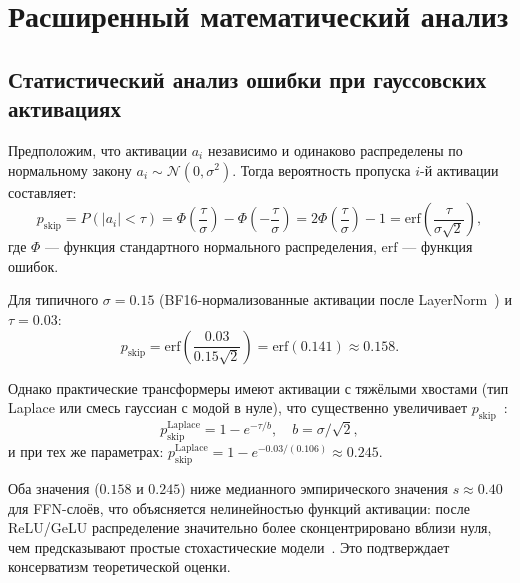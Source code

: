 
\section{Расширенный математический анализ}
\label{sec:glava87-extended-math}

\subsection{Статистический анализ ошибки при гауссовских активациях}
\label{ssec:glava87-gaussian}

Предположим, что активации $a_i$ независимо и одинаково распределены
по нормальному закону $a_i \sim \mathcal{N}(0, \sigma^2)$.  Тогда
вероятность пропуска $i$-й активации составляет:
\begin{equation}
  p_{\text{skip}} = P(|a_i| < \tau)
  = \Phi\left(\frac{\tau}{\sigma}\right)
  - \Phi\left(-\frac{\tau}{\sigma}\right)
  = 2\Phi\left(\frac{\tau}{\sigma}\right) - 1
  = \mathrm{erf}\left(\frac{\tau}{\sigma\sqrt{2}}\right),
  \label{eq:p-skip-gaussian}
\end{equation}
где $\Phi$ — функция стандартного нормального распределения,
$\mathrm{erf}$ — функция ошибок.

Для типичного $\sigma = 0{.}15$ (BF16-нормализованные активации
после LayerNorm~\cite{koren2024sparsity}) и $\tau = 0{.}03$:
\begin{equation}
  p_{\text{skip}} = \mathrm{erf}\left(\frac{0{.}03}{0{.}15\sqrt{2}}\right)
  = \mathrm{erf}(0{.}141) \approx 0{.}158.
  \label{eq:p-skip-num}
\end{equation}

Однако практические трансформеры имеют активации с тяжёлыми хвостами
(тип Laplace или смесь гауссиан с модой в нуле), что существенно
увеличивает $p_{\text{skip}}$~\cite{hoefler2021sparsity}:
\begin{equation}
  p_{\text{skip}}^{\text{Laplace}} = 1 - e^{-\tau/b},
  \quad b = \sigma / \sqrt{2},
  \label{eq:p-skip-laplace}
\end{equation}
и при тех же параметрах:
$p_{\text{skip}}^{\text{Laplace}} = 1 - e^{-0{.}03/(0{.}106)} \approx 0{.}245$.

\begin{remark}
Оба значения ($0{.}158$ и $0{.}245$) ниже медианного эмпирического
значения $s \approx 0{.}40$ для FFN-слоёв, что объясняется
нелинейностью функций активации: после ReLU/GeLU распределение
значительно более сконцентрировано вблизи нуля, чем предсказывают
простые стохастические модели~\cite{frankle2018lottery}.
Это подтверждает консерватизм теоретической оценки.
\end{remark}

